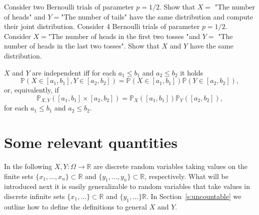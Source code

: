	\begin{ExerciseList} 
		\Exercise 
		\Question Consider two Bernoulli trials of parameter $p = 1/2$. Show that $X=$ "The number of heads" and $Y =$"The number of tails" have the same distribution and compute their joint distribution.   
		\Question Consider 4 Bernoulli trials of parameter $p = 1/2$. Consider $X = $"The number of heads in the first two tosses "and $Y =$ "The number of heads in the last two tosses". Show that $X$ and $Y$ have the same distribution.  
	\end{ExerciseList} 
	\begin{definition}[Independence]
		$X$ and $Y$ are independent iff for each $a_1 \leq b_1$ and $a_2 \leq b_2$ it holds 
	\begin{equation}
		\mathbb P( X \in  [a_1,b_1] , Y \in [a_2,b_2]) = \mathbb P(X \in [a_1, b_1]) \mathbb P(Y \in [a_2, b_2]),
	\end{equation}
	or, equivalently, if 
	\begin{equation}
	\mathbb P_{X,Y}([a_1,b_1]\times [a_2, b_2]) = \mathbb P_X([a_1, b_1]) \mathbb P_Y([a_2,b_2]),
	\end{equation}
 for each $a_1 \leq b_1$ and $a_2 \leq b_2$. 
	\end{definition}	
	\section{Some relevant quantities}
	In the following $X, Y: \Omega \to \mathbb R$ are discrete random variables taking values on the finite sets $\{x_1,\ldots, x_n\}\subset \mathbb R$ and $\{y_1,\ldots, y_n\}\subset\mathbb R$, respectively. What will be introduced next it is easily generalizable to random variables that take values in discrete infinite sets $\{x_1,\ldots \}\subset \mathbb R$ and $\{y_1,\ldots\}\mathbb R$. In Section~\ref{s:uncountable} we outline how to define the definitions to general $X$ and $Y$.
 
